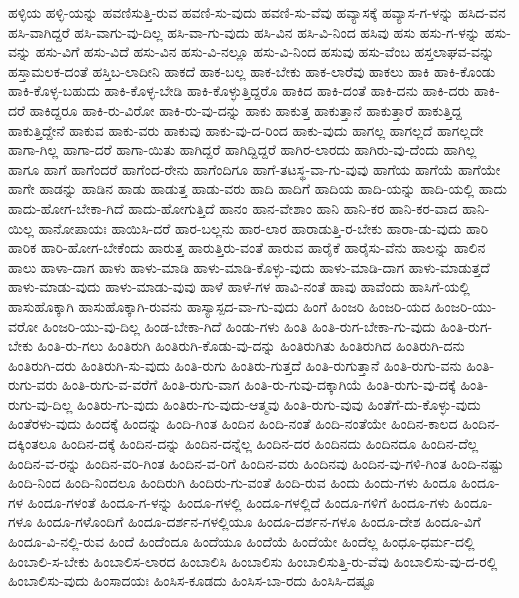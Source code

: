 {ಹಳ್ಳಿಯ
ಹಳ್ಳಿ-ಯನ್ನು
ಹವಣಿಸುತ್ತಿ-ರುವ
ಹವಣಿ-ಸು-ವುದು
ಹವಣಿ-ಸು-ವೆವು
ಹವ್ಯಾಸಕ್ಕೆ
ಹವ್ಯಾಸ-ಗ-ಳನ್ನು
ಹಸಿದ-ವನ
ಹಸಿ-ವಾಗಿದ್ದರೆ
ಹಸಿ-ವಾಗು-ವು-ದಿಲ್ಲ
ಹಸಿ-ವಾ-ಗು-ವುದು
ಹಸಿ-ವಿನ
ಹಸಿ-ವಿ-ನಿಂದ
ಹಸಿವು
ಹಸು
ಹಸು-ಗ-ಳನ್ನು
ಹಸು-ವನ್ನು
ಹಸು-ವಿಗೆ
ಹಸು-ವಿದೆ
ಹಸು-ವಿನ
ಹಸು-ವಿ-ನಲ್ಲೂ
ಹಸು-ವಿ-ನಿಂದ
ಹಸುವು
ಹಸು-ವೆಂಬ
ಹಸ್ತಲಾಘವ-ವನ್ನು
ಹಸ್ತಾಮಲಕ-ದಂತೆ
ಹಸ್ತಿಬ-ಲಾದೀನಿ
ಹಾಕದೆ
ಹಾಕ-ಬಲ್ಲ
ಹಾಕ-ಬೇಕು
ಹಾಕ-ಲಾರೆವು
ಹಾಕಲು
ಹಾಕಿ
ಹಾಕಿ-ಕೊಂಡು
ಹಾಕಿ-ಕೊಳ್ಳ-ಬಹುದು
ಹಾಕಿ-ಕೊಳ್ಳ-ಬೇಡಿ
ಹಾಕಿ-ಕೊಳ್ಳುತ್ತಿದ್ದರೊ
ಹಾಕಿದ
ಹಾಕಿ-ದಂತೆ
ಹಾಕಿ-ದನು
ಹಾಕಿ-ದರು
ಹಾಕಿ-ದರೆ
ಹಾಕಿದ್ದರೂ
ಹಾಕಿ-ರು-ವಿರೋ
ಹಾಕಿ-ರು-ವು-ದನ್ನು
ಹಾಕು
ಹಾಕುತ್ತ
ಹಾಕುತ್ತಾನೆ
ಹಾಕುತ್ತಾರೆ
ಹಾಕುತ್ತಿದ್ದ
ಹಾಕುತ್ತಿದ್ದೇನೆ
ಹಾಕುವ
ಹಾಕು-ವರು
ಹಾಕುವು
ಹಾಕು-ವು-ದ-ರಿಂದ
ಹಾಕು-ವುದು
ಹಾಗಲ್ಲ
ಹಾಗಲ್ಲದೆ
ಹಾಗಲ್ಲದೇ
ಹಾಗಾ-ಗಿಲ್ಲ
ಹಾಗಾ-ದರೆ
ಹಾಗಾ-ಯಿತು
ಹಾಗಿದ್ದರೆ
ಹಾಗಿದ್ದಿದ್ದರೆ
ಹಾಗಿರ-ಲಾರದು
ಹಾಗಿರು-ವು-ದೆಂದು
ಹಾಗಿಲ್ಲ
ಹಾಗೂ
ಹಾಗೆ
ಹಾಗೆಂದರೆ
ಹಾಗೆಂದ-ರೇನು
ಹಾಗೆಂದಿಗೂ
ಹಾಗೆ-ತಟಸ್ಥ-ವಾ-ಗು-ವುವು
ಹಾಗೆಯ
ಹಾಗೆಯೆ
ಹಾಗೆಯೇ
ಹಾಗೇ
ಹಾಡನ್ನು
ಹಾಡಿನ
ಹಾಡು
ಹಾಡುತ್ತ
ಹಾಡು-ವರು
ಹಾದಿ
ಹಾದಿಗೆ
ಹಾದಿಯ
ಹಾದಿ-ಯನ್ನು
ಹಾದಿ-ಯಲ್ಲಿ
ಹಾದು
ಹಾದು-ಹೋಗ-ಬೇಕಾ-ಗಿದೆ
ಹಾದು-ಹೋಗುತ್ತಿದೆ
ಹಾನಂ
ಹಾನ-ವೇಶಾಂ
ಹಾನಿ
ಹಾನಿ-ಕರ
ಹಾನಿ-ಕರ-ವಾದ
ಹಾನಿ-ಯಿಲ್ಲ
ಹಾನೋಪಾಯಃ
ಹಾಯಿಸಿ-ದರೆ
ಹಾರ-ಬಲ್ಲನು
ಹಾರ-ಲಾರ
ಹಾರಾಡುತ್ತಿ-ರ-ಬೇಕು
ಹಾರಾ-ಡು-ವುದು
ಹಾರಿ
ಹಾರಿಕ
ಹಾರಿ-ಹೋಗ-ಬೇಕೆಂದು
ಹಾರುತ್ತ
ಹಾರುತ್ತಿರು-ವಂತೆ
ಹಾರುವ
ಹಾರೈಕೆ
ಹಾರೈಸು-ವೆನು
ಹಾಲನ್ನು
ಹಾಲಿನ
ಹಾಲು
ಹಾಳಾ-ದಾಗ
ಹಾಳು
ಹಾಳು-ಮಾಡಿ
ಹಾಳು-ಮಾಡಿ-ಕೊಳ್ಳು-ವುದು
ಹಾಳು-ಮಾಡಿ-ದಾಗ
ಹಾಳು-ಮಾಡುತ್ತದೆ
ಹಾಳು-ಮಾಡು-ವುದು
ಹಾಳು-ಮಾಡು-ವುವು
ಹಾಳೆ
ಹಾಳೆ-ಗಳ
ಹಾವಿ-ನಂತೆ
ಹಾವು
ಹಾವೆಂದು
ಹಾಸಿಗೆ-ಯಲ್ಲಿ
ಹಾಸುಹೊಕ್ಕಾಗಿ
ಹಾಸುಹೊಕ್ಕಾಗಿ-ರುವನು
ಹಾಸ್ಯಾಸ್ಪದ-ವಾ-ಗು-ವುದು
ಹಿಂಗೆ
ಹಿಂಜರಿ
ಹಿಂಜರಿ-ಯದ
ಹಿಂಜರಿ-ಯು-ವರೋ
ಹಿಂಜರಿ-ಯು-ವು-ದಿಲ್ಲ
ಹಿಂಡ-ಬೇಕಾ-ಗಿದೆ
ಹಿಂಡು-ಗಳು
ಹಿಂತಿ
ಹಿಂತಿ-ರುಗ-ಬೇಕಾ-ಗು-ವುದು
ಹಿಂತಿ-ರುಗ-ಬೇಕು
ಹಿಂತಿ-ರು-ಗಲು
ಹಿಂತಿರುಗಿ
ಹಿಂತಿರುಗಿ-ಕೊಡು-ವು-ದನ್ನು
ಹಿಂತಿರುಗಿತು
ಹಿಂತಿರುಗಿದ
ಹಿಂತಿರುಗಿ-ದನು
ಹಿಂತಿರುಗಿ-ದರು
ಹಿಂತಿರುಗಿ-ಸು-ವುದು
ಹಿಂತಿ-ರುಗು
ಹಿಂತಿರು-ಗುತ್ತದೆ
ಹಿಂತಿ-ರುಗುತ್ತಾನೆ
ಹಿಂತಿ-ರುಗು-ವನು
ಹಿಂತಿ-ರುಗು-ವರು
ಹಿಂತಿ-ರುಗು-ವ-ವರೆಗೆ
ಹಿಂತಿ-ರುಗು-ವಾಗ
ಹಿಂತಿ-ರು-ಗುವು-ದಕ್ಕಾಗಿಯೆ
ಹಿಂತಿ-ರುಗು-ವು-ದಕ್ಕೆ
ಹಿಂತಿ-ರುಗು-ವು-ದಿಲ್ಲ
ಹಿಂತಿರು-ಗು-ವುದು
ಹಿಂತಿರು-ಗು-ವುದು-ಆತ್ಮವು
ಹಿಂತಿ-ರುಗು-ವುವು
ಹಿಂತೆಗೆ-ದು-ಕೊಳ್ಳು-ವುದು
ಹಿಂತೆರಳು-ವುದು
ಹಿಂದಕ್ಕೆ
ಹಿಂದನ್ನು
ಹಿಂದಿ-ಗಿಂತ
ಹಿಂದಿನ
ಹಿಂದಿ-ನಂತೆ
ಹಿಂದಿ-ನಂತೆಯೇ
ಹಿಂದಿನ-ಕಾಲದ
ಹಿಂದಿನ-ದಕ್ಕಿಂತಲೂ
ಹಿಂದಿನ-ದಕ್ಕೆ
ಹಿಂದಿನ-ದನ್ನು
ಹಿಂದಿನ-ದನ್ನೆಲ್ಲ
ಹಿಂದಿನ-ದರ
ಹಿಂದಿನದು
ಹಿಂದಿನದೂ
ಹಿಂದಿನ-ದೆಲ್ಲ
ಹಿಂದಿನ-ವ-ರನ್ನು
ಹಿಂದಿನ-ವರಿ-ಗಿಂತ
ಹಿಂದಿನ-ವ-ರಿಗೆ
ಹಿಂದಿನ-ವರು
ಹಿಂದಿನವು
ಹಿಂದಿನ-ವು-ಗಳಿ-ಗಿಂತ
ಹಿಂದಿ-ನಷ್ಟು
ಹಿಂದಿ-ನಿಂದ
ಹಿಂದಿ-ನಿಂದಲೂ
ಹಿಂದಿರುಗಿ
ಹಿಂದಿರು-ಗು-ವಂತೆ
ಹಿಂದಿ-ರುವ
ಹಿಂದು
ಹಿಂದು-ಗಳು
ಹಿಂದೂ
ಹಿಂದೂ-ಗಳ
ಹಿಂದೂ-ಗಳಂತೆ
ಹಿಂದೂ-ಗ-ಳನ್ನು
ಹಿಂದೂ-ಗಳಲ್ಲಿ
ಹಿಂದೂ-ಗಳಲ್ಲಿದೆ
ಹಿಂದೂ-ಗಳಿಗೆ
ಹಿಂದೂ-ಗಳು
ಹಿಂದೂ-ಗಳೂ
ಹಿಂದೂ-ಗಳೊಂದಿಗೆ
ಹಿಂದೂ-ದರ್ಶನ-ಗಳಲ್ಲಿಯೂ
ಹಿಂದೂ-ದರ್ಶನ-ಗಳೂ
ಹಿಂದೂ-ದೇಶ
ಹಿಂದೂ-ವಿಗೆ
ಹಿಂದೂ-ವಿ-ನಲ್ಲಿ-ರುವ
ಹಿಂದೆ
ಹಿಂದೆಂದೂ
ಹಿಂದೆಯೂ
ಹಿಂದೆಯೆ
ಹಿಂದೆಯೇ
ಹಿಂದೆಲ್ಲ
ಹಿಂಧೂ-ಧರ್ಮ-ದಲ್ಲಿ
ಹಿಂಬಾಲಿ-ಸ-ಬೇಕು
ಹಿಂಬಾಲಿಸ-ಲಾರದ
ಹಿಂಬಾಲಿಸಿ
ಹಿಂಬಾಲಿಸು
ಹಿಂಬಾಲಿಸುತ್ತಿ-ರು-ವೆವು
ಹಿಂಬಾಲಿಸು-ವು-ದ-ರಲ್ಲಿ
ಹಿಂಬಾಲಿಸು-ವುದು
ಹಿಂಸಾದಯಃ
ಹಿಂಸಿಸ-ಕೂಡದು
ಹಿಂಸಿಸ-ಬಾ-ರದು
ಹಿಂಸಿಸಿ-ದಷ್ಟೂ
}
